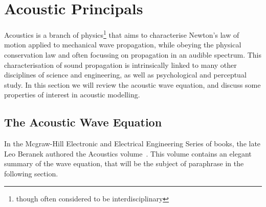 %
%
%
\chapter{Acoustic Principals}
\label{Introduction}
Acoustics is a branch of physics\footnote{though often considered to be interdisciplinary} that aims to characterise Newton's law of motion applied to mechanical wave propagation, while obeying the physical conservation law and often focussing on propagation in an audible spectrum. This characterisation of sound propagation is intrinsically linked to many other disciplines of science and engineering, as well as psychological and perceptual study. In this section we will review the acoustic wave equation, and discuss some properties of interest in acoustic modelling.


\section{The Acoustic Wave Equation}

In the Mcgraw-Hill Electronic and Electrical Engineering Series of books, the late Leo Beranek authored the Acoustics volume~\cite{beranek1954acoustics}. This volume contains an elegant summary of the wave equation, that will be the subject of paraphrase in the following section.\\

